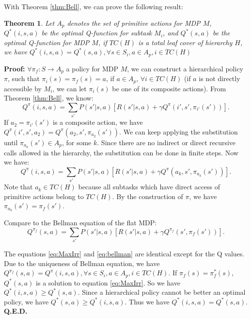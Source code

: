\documentclass{article} %
\newtheorem{theorem}{Theorem}
\begin{document}
With Theorem \ref{thm:Bell}, we can prove the following result:
\begin{theorem}
    Let $A_p$ denotes the set of primitive actions for MDP $M$, $Q^*(i, s, a)$ be the optimal Q-function for subtask $M_i$, and
    $Q^*(s, a)$ be the optimal Q-function for MDP $M$, 
    if $TC(H)$ is a total leaf cover of hierarchy $H$, we have $Q^*(i, s, a) = Q^*(s, a), \forall s \in S_i, a \in A_p, i \in TC(H)$
    \label{thm:opt}
\end{theorem}
\textbf{Proof:} 
    $\forall \pi_f: S \rightarrow A_p$ a policy for MDP $M$, we can construct a hierarchical policy $\pi$, such that
    $\pi_i(s) = \pi_f(s) = a$, if $a \in A_p$, $\forall i \in TC(H)$ (if $a$ is not directly accessible by $M_i$, we can
    let $\pi_i(s)$ be one of its composite actions).
    From Theorem \ref{thm:Bell}, we know: 
    \begin{equation}
        Q^{\pi}(i, s, a) = \sum_{s'}P(s'|s, a)[R(s'|s, a) + \gamma Q^{\pi}(i', s', \pi_{i'}(s'))].
    \end{equation}
    If $a_2= \pi_{i'}(s')$ is a composite action, we have $Q^{\pi}(i', s', a_2) = Q^{\pi}(a_2, s', \pi_{a_2}(s'))$. 
    We can keep applying the substitution until $\pi_{a_k}(s') \in A_p$, for some $k$. Since there are no
    indirect or direct recursive calls allowed in the hierarchy, the substitution can be done in finite 
    steps. Now we have:
    \begin{equation}
        Q^{\pi}(i, s, a) = \sum_{s'}P(s'|s, a)[R(s'|s, a) + \gamma Q^{\pi}(a_k, s', \pi_{a_k}(s'))].
        \label{eq:MaxIrr}
    \end{equation}
    Note that $a_k \in TC(H)$ because all subtasks which have direct access of primitive actions belong to $TC(H)$.
    By the construction of $\pi$, we have $\pi_{a_k}(s') = \pi_f(s')$.
    
    Compare to the Bellman equation of the flat MDP:
    \begin{equation}
        Q^{\pi_f}(s, a) = \sum_{s'}P(s'|s, a)[R(s'| s, a) + \gamma Q^{\pi_f}(s', \pi_f(s'))].
        \label{eq:bellman}
    \end{equation}

    The equations \ref{eq:MaxIrr} and \ref{eq:bellman} are identical except for the Q values.
    Due to the uniqueness of Bellman equation, we have $Q^{\pi_f}(s, a) = Q^{\pi}(i, s, a), \forall s \in S_i, a \in A_p, i \in TC(H)$. 
    If $\pi_f(s) = \pi^*_f(s)$, $Q^*(s, a)$ is a solution to equation \ref{eq:MaxIrr}. So we have $Q^*(i, s, a) \geq Q^*(s, a)$.
    Since a hierarchical policy cannot be better an optimal policy, we have $Q^*(s, a) \geq Q^*(i, s, a)$.
    Thus we have $Q^*(i, s, a) = Q^*(s, a)$. \textbf{Q.E.D.}
\end{document}
